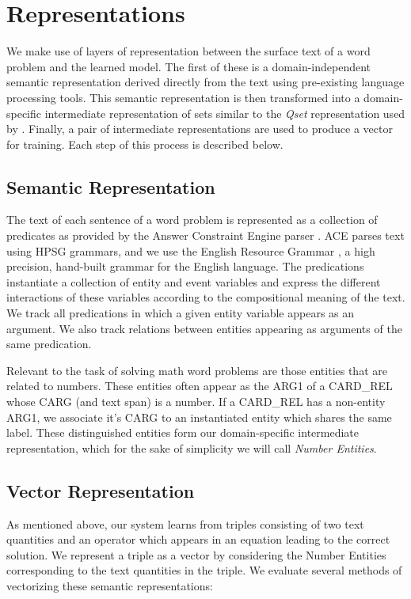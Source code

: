 \section{Representations}
We make use of layers of representation between the surface text of a word problem and the learned model. 
The first of these is a domain-independent semantic representation derived directly from the text using pre-existing language processing tools.
This semantic representation is then transformed into a domain-specific intermediate representation of sets similar to the {\it Qset} representation used by \cite{koncel2015parsing}. 
Finally, a pair of intermediate representations are used to produce a vector for training. 
Each step of this process is described below.

\subsection{Semantic Representation}
\label{semantics}
The text of each sentence of a word problem is represented as a collection of predicates as provided by the Answer Constraint Engine parser \cite{ace}.
ACE parses text using HPSG grammars, and we use the English Resource Grammar \cite{flickinger2000building,flickinger2011accuracy}, a high precision, hand-built grammar for the English language. 
The predications instantiate a collection of entity and event variables and express the different interactions of these variables according to the compositional meaning of the text. 
We track all predications in which a given entity variable appears as an argument.
We also track relations between entities appearing as arguments of the same predication.

Relevant to the task of solving math word problems are those entities that are related to numbers.
These entities often appear as the ARG1 of a CARD\_REL whose CARG (and text span) is a number. 
If a CARD\_REL has a non-entity ARG1, we associate it's CARG to an instantiated entity which shares the same label. 
These distinguished entities form our domain-specific intermediate representation, which for the sake of simplicity we will call {\it Number Entities}.

\subsection{Vector Representation}
\label{vectors}
As mentioned above, our system learns from triples consisting of two text quantities and an operator which appears in an equation leading to the correct solution. 
We represent a triple as a vector by considering the Number Entities corresponding to the text quantities in the triple. 
We evaluate several methods of vectorizing these semantic representations:
